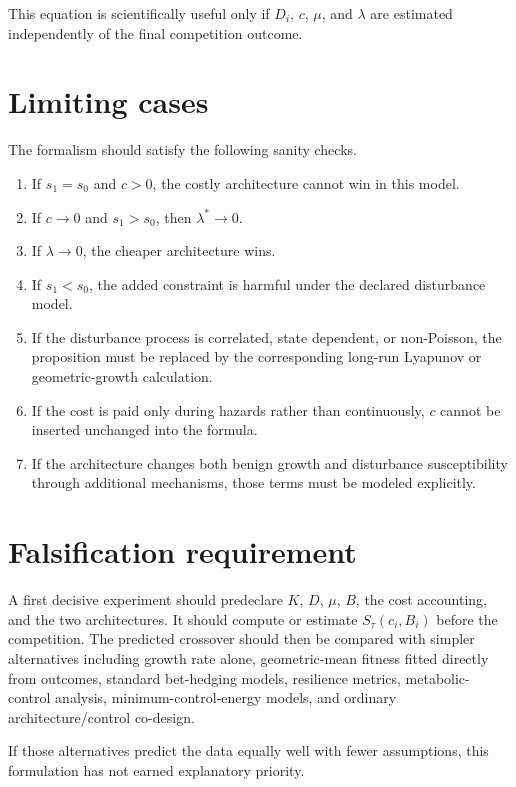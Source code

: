 \documentclass[11pt]{article}
\begin{document}
This equation is scientifically useful only if $D_i$, $c$, $\mu$, and $\lambda$ are estimated independently of the final competition outcome.

\section{Limiting cases}

The formalism should satisfy the following sanity checks.

\begin{enumerate}
\item If $s_1=s_0$ and $c>0$, the costly architecture cannot win in this model.
\item If $c\to0$ and $s_1>s_0$, then $\lambda^*\to0$.
\item If $\lambda\to0$, the cheaper architecture wins.
\item If $s_1<s_0$, the added constraint is harmful under the declared disturbance model.
\item If the disturbance process is correlated, state dependent, or non-Poisson, the proposition must be replaced by the corresponding long-run Lyapunov or geometric-growth calculation.
\item If the cost is paid only during hazards rather than continuously, $c$ cannot be inserted unchanged into the formula.
\item If the architecture changes both benign growth and disturbance susceptibility through additional mechanisms, those terms must be modeled explicitly.
\end{enumerate}

\section{Falsification requirement}

A first decisive experiment should predeclare $K$, $D$, $\mu$, $B$, the cost accounting, and the two architectures. It should compute or estimate $S_\tau(c_i,B_i)$ before the competition. The predicted crossover should then be compared with simpler alternatives including growth rate alone, geometric-mean fitness fitted directly from outcomes, standard bet-hedging models, resilience metrics, metabolic-control analysis, minimum-control-energy models, and ordinary architecture/control co-design.

If those alternatives predict the data equally well with fewer assumptions, this formulation has not earned explanatory priority.
\end{document}
